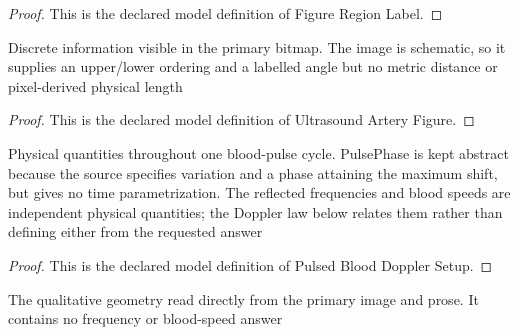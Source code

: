 \begin{proof}
  This is the declared model definition of Figure Region Label.
\end{proof}
\begin{definition}
  \label{def:physics:phyx-mini-0324:phyxminiproblems-problemphyxmini0324-ultrasoundarteryfigure}
  Discrete information visible in the primary bitmap. The image is schematic, so it supplies an upper/lower ordering and a labelled angle but no metric distance or pixel-derived physical length
\end{definition}
\begin{proof}
  This is the declared model definition of Ultrasound Artery Figure.
\end{proof}
\begin{definition}
  \label{def:physics:phyx-mini-0324:phyxminiproblems-problemphyxmini0324-pulsedblooddopplersetup}
  Physical quantities throughout one blood-pulse cycle. PulsePhase is kept abstract because the source specifies variation and a phase attaining the maximum shift, but gives no time parametrization. The reflected frequencies and blood speeds are independent physical quantities; the Doppler law below relates them rather than defining either from the requested answer
\end{definition}
\begin{proof}
  This is the declared model definition of Pulsed Blood Doppler Setup.
\end{proof}
\begin{definition}
  \label{def:physics:phyx-mini-0324:phyxminiproblems-problemphyxmini0324-matchesprimaryfigureandscenario}
  The qualitative geometry read directly from the primary image and prose. It contains no frequency or blood-speed answer
\end{definition}
